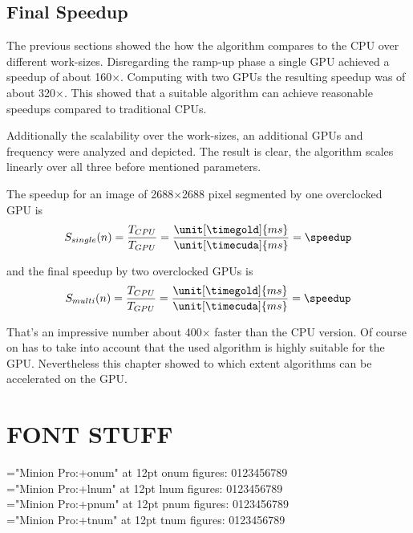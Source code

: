 

\section{Final Speedup} %
\label{sec:final_speedup}
The previous sections showed the how the algorithm compares to the \gls{CPU} over
different work-sizes. Disregarding the ramp-up phase a single \gls{GPU} achieved
a speedup of about 160$\times$. Computing with two \glspl{GPU} the resulting 
speedup was of about 320$\times$. This showed that a suitable algorithm can 
achieve reasonable speedups compared to traditional \glspl{CPU}.

Additionally the scalability over the work-sizes, an additional \glspl{GPU} and
frequency were analyzed and depicted. The result is clear, the algorithm scales
linearly over all three before mentioned parameters. 

\fpDiv{\speedup}{\timegold}{\timecuda}

The speedup for an image of 2688$\times$2688 pixel segmented by one
overclocked \gls{GPU} is 
\begin{equation}\label{eq:final_speedup_single}
 S_{single}(n) = \frac{T_{CPU}}{T_{GPU}} = \frac{\unit[\timegold]{ms}}{\unit[\timecuda]{ms}} = \speedup
\end{equation}

\fpDiv{\speedup}{\timegold}{\timecuda}

and the final speedup by two overclocked \glspl{GPU} is
\begin{equation}\label{eq:final_speedup_multi}
 S_{multi}(n) = \frac{T_{CPU}}{T_{GPU}} = \frac{\unit[\timegold]{ms}}{\unit[\timecuda]{ms}} = \speedup
\end{equation}

That's an impressive number about 400$\times$ faster than the \gls{CPU} version. 
Of course on has to take into account that the used algorithm is highly suitable
for the \gls{GPU}. Nevertheless this chapter showed to which extent algorithms 
can be accelerated on the \gls{GPU}.



\chapter{FONT STUFF}
\font\fonta="Minion Pro:+onum" at 12pt \fonta onum figures: 0123456789 \\
\font\fonta="Minion Pro:+lnum" at 12pt \fonta lnum figures: 0123456789 \\
\font\fonta="Minion Pro:+pnum" at 12pt \fonta pnum figures: 0123456789 \\
\font\fonta="Minion Pro:+tnum" at 12pt \fonta tnum figures: 0123456789


